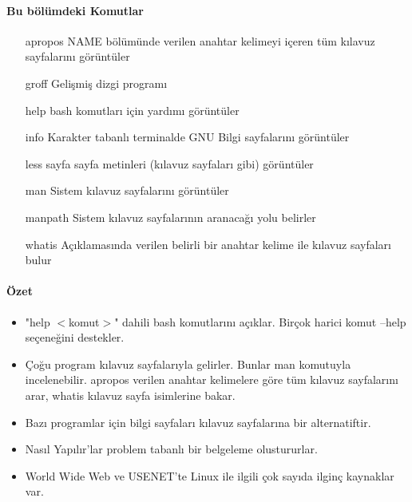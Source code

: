 \paragraph{Bu bölümdeki Komutlar}{
\begin{itemize}
\item[apropos] 	NAME bölümünde verilen anahtar kelimeyi içeren tüm kılavuz sayfalarını görüntüler
\item[groff]		Gelişmiş dizgi programı
\item[help] 		bash komutları için yardımı görüntüler
\item[info] 		Karakter tabanlı terminalde GNU Bilgi sayfalarını görüntüler
\item[less]		sayfa sayfa metinleri (kılavuz sayfaları gibi) görüntüler
\item[man]		Sistem kılavuz sayfalarını görüntüler
\item[manpath]		Sistem kılavuz sayfalarının aranacağı yolu belirler
\item[whatis]		Açıklamasında verilen belirli bir anahtar kelime ile kılavuz sayfaları bulur
\end{itemize}}
\paragraph{Özet}{
\begin{itemize}
\item "help $<$komut$>$" dahili bash komutlarını açıklar. Birçok harici komut --help seçeneğini destekler.
\item Çoğu program kılavuz sayfalarıyla gelirler. Bunlar man komutuyla incelenebilir. apropos verilen anahtar kelimelere göre tüm kılavuz sayfalarını arar, whatis kılavuz sayfa isimlerine bakar.
\item Bazı programlar için bilgi sayfaları kılavuz sayfalarına bir alternatiftir.
\item Nasıl Yapılır'lar problem tabanlı bir belgeleme olustururlar.
\item World Wide Web ve USENET'te Linux ile ilgili çok sayıda ilginç kaynaklar var.
\end{itemize}}